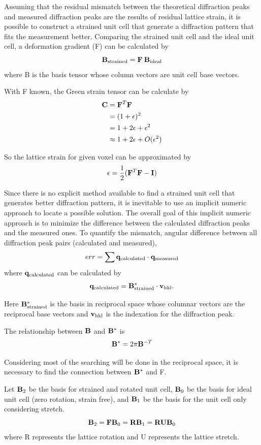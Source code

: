 \documentclass[12pt]{scrartcl}
\begin{document}
\begin{enumerate}
Assuming that the residual mismatch between the theoretical diffraction peaks and measured diffraction peaks are the results of residual lattice strain, it is possible to construct a strained unit cell that generate a diffraction pattern that fits the measurement better.
Comparing the strained unit cell and the ideal unit cell, a deformation gradient (\tnsr F) can be calculated by
\[
	\mathbf{B}_\text{strained} = \mathbf{F} \: \mathbf{B}_\text{ideal}
\]
where \tnsr B is the basis tensor whose column vectors are unit cell base vectors.

With \tnsr F known, the Green strain tensor can be calculate by
\begin{align*}
	\mathbf{C} &= \mathbf{F}^T \mathbf{F} \\
	            &= (1 + \mathbf{\epsilon})^2 \\
	            &= 1 + 2\epsilon + \epsilon^2 \\
	            &\approx 1 + 2\epsilon + O(\epsilon^2)
\end{align*}

So the lattice strain for given voxel can be approximated by
\[
	\epsilon = \dfrac{1}{2} (\mathbf{F}^T\mathbf{F} - \mathbf{I})
\]

Since there is no explicit method available to find a strained unit cell that generates better diffraction pattern, it is inevitable to use an implicit numeric approach to locate a possible solution.
The overall goal of this implicit numeric approach is to minimize the difference between the calculated diffraction peaks and the measured ones.
To quantify the mismatch, angular difference between all diffraction peak pairs (calculated and measured),
\[
	err = \sum \mathbf{q}_\text{calculated} \cdot \mathbf{q}_\text{measured}
\]
where $\mathbf{q}_\text{calculated}$ can be calculated by
\[
	\mathbf{q}_\text{calculated} = \mathbf{B}^*_\text{strained} \cdot \mathbf{v}_\text{hkl}.
\]

Here $\mathbf{B}^*_\text{strained}$ is the basis in reciprocal space whose columnar vectors are the reciprocal base vectors and $\mathbf{v}_\text{hkl}$ is the indexation for the diffraction peak.

The relationship between $\mathbf{B}$ and $\mathbf{B}^*$ is
\[
	\mathbf{B}^* = 2 \pi \mathbf{B}^{-T}
\]

Considering most of the searching will be done in the reciprocal space, it is necessary to find the connection between $\mathbf{B}^*$ and \tnsr F.

Let $\mathbf{B}_2$ be the basis for strained and rotated unit cell, $\mathbf{B}_0$ be the basis for ideal unit cell (zero rotation, strain free), and $\mathbf{B}_1$ be the basis for the unit cell only considering stretch.
\[
	\mathbf{B}_2 = \mathbf{F} \mathbf{B}_0 = \mathbf{R} \mathbf{B}_1 = \mathbf{R} \mathbf{U} \mathbf{B}_0
\]
where \tnsr R represents the lattice rotation and \tnsr U represents the lattice stretch.


\end{enumerate}
\end{document}
